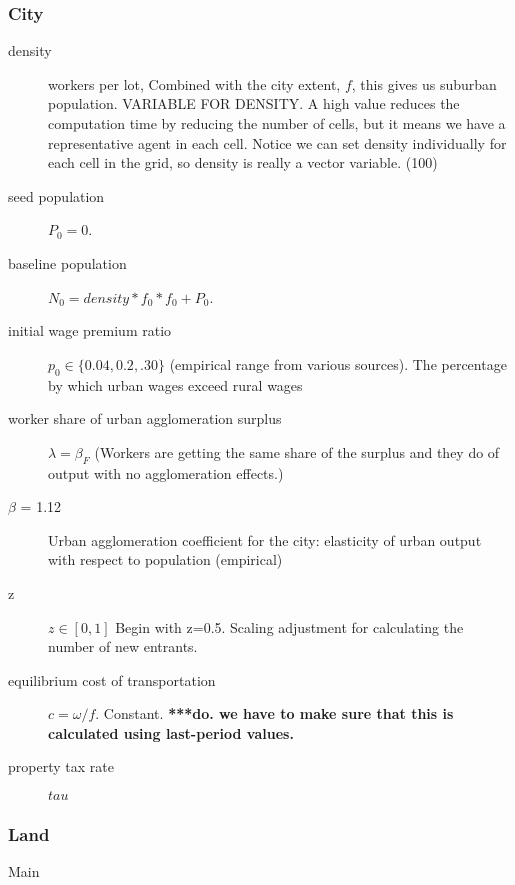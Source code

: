     \subsubsection{City}
\begin{description}
\item [density]  workers per lot, Combined with the city extent, $f$, this gives us suburban population. VARIABLE FOR DENSITY. A high value reduces the computation time by reducing the number of cells, but it means we have a representative agent in  each cell. Notice we can set density individually for each cell in the grid, so density is really a vector variable. (100) %
\item [seed population] $P_0=0$. %
\item [baseline population] $N_0=density * f_0 * f_0 + P_0$.

\item [initial wage premium ratio] $p_0\in\{0.04,0.2,.30\}$ (empirical range from various sources). The percentage by which urban wages exceed rural wages 
\item [worker share of urban agglomeration surplus] $\lambda=\beta_F$ (Workers are getting the same share of the surplus and they do of output with no agglomeration effects.)
\item [$\beta$ = 1.12] Urban agglomeration coefficient for the city: elasticity of urban output with respect to population (empirical)
\item [z] $z\in[0,1]$ Begin with z=0.5. Scaling adjustment for calculating the number of new entrants. 
\item [equilibrium cost of transportation] $c = \omega/f$. Constant.
\textbf{***do. we have to make sure that this is calculated using last-period values.}

\item [property tax rate] $tau$
\end{description}


\subsubsection{Land}
\begin{description}
\item[Main]
\end{description}

